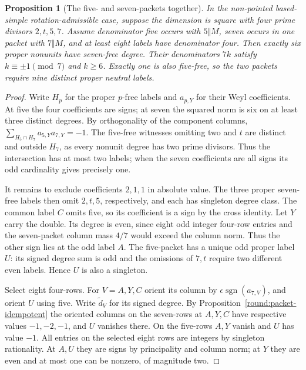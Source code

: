 \documentclass[11pt]{amsart}
\numberwithin{equation}{section}
\newtheorem{proposition}[theorem]{Proposition}
\theoremstyle{definition}
\theoremstyle{plain}
\begin{document}
\begin{proposition}[The five- and seven-packets together]\label{prop:joint-five-seven}
In the non-pointed based-simple rotation-admissible case, suppose the dimension is square with four prime divisors $2,t,5,7$. Assume denominator five occurs with $5\Vert M$, seven occurs in one packet with $7\Vert M$, and at least eight labels have denominator four. Then exactly six proper nonunits have seven-free degree. Their denominators $7k$ satisfy $k\equiv\pm1\pmod7$ and $k\ge6$. Exactly one is also five-free, so the two packets require nine distinct proper neutral labels.
\end{proposition}
\begin{proof}
Write $H_p$ for the proper $p$-free labels and $a_{p,Y}$ for their Weyl coefficients. At five the four coefficients are signs; at seven the squared norm is six on at least three distinct degrees. By orthogonality of the component columns,
$\sum_{H_5\cap H_7}a_{5,Y}a_{7,Y}=-1$. The five-free witnesses omitting two and $t$ are distinct and outside $H_7$, as every nonunit degree has two prime divisors. Thus the intersection has at most two labels; when the seven coefficients are all signs its odd cardinality gives precisely one.

It remains to exclude coefficients $2,1,1$ in absolute value. The three proper seven-free labels then omit $2,t,5$, respectively, and each has singleton degree class. The common label $C$ omits five, so its coefficient is a sign by the cross identity. Let $Y$ carry the double. Its degree is even, since eight odd integer four-row entries and the seven-packet column mass $4/7$ would exceed the column norm. Thus the other sign lies at the odd label $A$. The five-packet has a unique odd proper label $U$: its signed degree sum is odd and the omissions of $7,t$ require two different even labels. Hence $U$ is also a singleton.

Select eight four-rows. For $V=A,Y,C$ orient its column by $\epsilon\operatorname{sgn}(a_{7,V})$, and orient $U$ using five. Write $\widetilde d_V$ for its signed degree. By Proposition~\ref{round:packet-idempotent} the oriented columns on the seven-rows at $A,Y,C$ have respective values $-1,-2,-1$, and $U$ vanishes there. On the five-rows $A,Y$ vanish and $U$ has value $-1$. All entries on the selected eight rows are integers by singleton rationality. At $A,U$ they are signs by principality and column norm; at $Y$ they are even and at most one can be nonzero, of magnitude two.


\end{proof}
\end{document}
